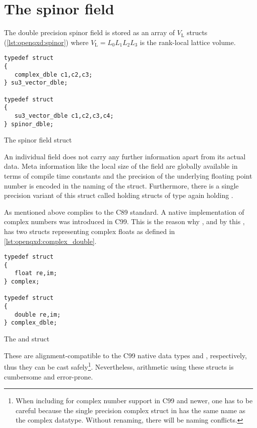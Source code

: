 \section{The spinor field}
\label{sec:openqxd:spinor:field}

The double precision spinor field is stored as an array of $V_\mathrm{L}$  structs (\cref{lst:openqxd:spinor}) where $V_\mathrm{L} = L_0 L_1 L_2 L_3$ is the rank-local lattice volume.
\begin{codelisting}
\begin{verbatim}
typedef struct
{
   complex_dble c1,c2,c3;
} su3_vector_dble;

typedef struct
{
   su3_vector_dble c1,c2,c3,c4;
} spinor_dble;
\end{verbatim}
\caption{The spinor field struct}
\label{lst:openqxd:spinor}
\end{codelisting}
An individual field does not carry any further information apart from its actual data. Meta information like the local size of the field are globally available in terms of compile time constants and the precision of the underlying floating point number is encoded in the naming of the struct.
Furthermore, there is a single precision variant of this struct called  holding structs of type  again holding .

As mentioned above \openqcd complies to the C89 standard. A native implementation of complex numbers was introduced in C99. This is the reason why \openqcd, and by this \openqxd, has two structs representing complex floats as defined in \cref{lst:openqxd:complex_double}.
\begin{codelisting}
\begin{verbatim}
typedef struct
{
   float re,im;
} complex;

typedef struct
{
   double re,im;
} complex_dble;
\end{verbatim}
\caption{The  and  struct}
\label{lst:openqxd:complex_double}
\end{codelisting}
These are alignment-compatible to the C99 native data types  and , respectively, thus they can be cast safely\footnote{When including  for complex number support in C99 and newer, one has to be careful because the single precision complex struct in \openqxd has the same name as the complex datatype. Without renaming, there will be naming conflicts.}.
Nevertheless, arithmetic using these structs is cumbersome and error-prone. 

